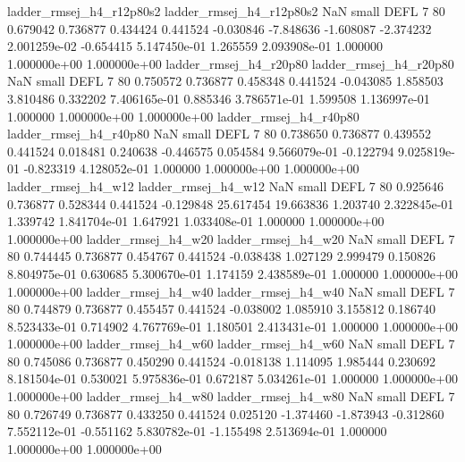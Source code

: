ladder_rmsej_h4_r12p80s2 ladder_rmsej_h4_r12p80s2                   NaN      small     DEFL                 7 80 0.679042       0.736877 0.434424       0.441524   -0.030846     -7.848636     -1.608087    -2.374232   2.001259e-02 -0.654415 5.147450e-01     1.265559   2.093908e-01            1.000000    1.000000e+00        1.000000e+00
  ladder_rmsej_h4_r20p80   ladder_rmsej_h4_r20p80                   NaN      small     DEFL                 7 80 0.750572       0.736877 0.458348       0.441524   -0.043085      1.858503      3.810486     0.332202   7.406165e-01  0.885346 3.786571e-01     1.599508   1.136997e-01            1.000000    1.000000e+00        1.000000e+00
  ladder_rmsej_h4_r40p80   ladder_rmsej_h4_r40p80                   NaN      small     DEFL                 7 80 0.738650       0.736877 0.439552       0.441524    0.018481      0.240638     -0.446575     0.054584   9.566079e-01 -0.122794 9.025819e-01    -0.823319   4.128052e-01            1.000000    1.000000e+00        1.000000e+00
     ladder_rmsej_h4_w12      ladder_rmsej_h4_w12                   NaN      small     DEFL                 7 80 0.925646       0.736877 0.528344       0.441524   -0.129848     25.617454     19.663836     1.203740   2.322845e-01  1.339742 1.841704e-01     1.647921   1.033408e-01            1.000000    1.000000e+00        1.000000e+00
     ladder_rmsej_h4_w20      ladder_rmsej_h4_w20                   NaN      small     DEFL                 7 80 0.744445       0.736877 0.454767       0.441524   -0.038438      1.027129      2.999479     0.150826   8.804975e-01  0.630685 5.300670e-01     1.174159   2.438589e-01            1.000000    1.000000e+00        1.000000e+00
     ladder_rmsej_h4_w40      ladder_rmsej_h4_w40                   NaN      small     DEFL                 7 80 0.744879       0.736877 0.455457       0.441524   -0.038002      1.085910      3.155812     0.186740   8.523433e-01  0.714902 4.767769e-01     1.180501   2.413431e-01            1.000000    1.000000e+00        1.000000e+00
     ladder_rmsej_h4_w60      ladder_rmsej_h4_w60                   NaN      small     DEFL                 7 80 0.745086       0.736877 0.450290       0.441524   -0.018138      1.114095      1.985444     0.230692   8.181504e-01  0.530021 5.975836e-01     0.672187   5.034261e-01            1.000000    1.000000e+00        1.000000e+00
     ladder_rmsej_h4_w80      ladder_rmsej_h4_w80                   NaN      small     DEFL                 7 80 0.726749       0.736877 0.433250       0.441524    0.025120     -1.374460     -1.873943    -0.312860   7.552112e-01 -0.551162 5.830782e-01    -1.155498   2.513694e-01            1.000000    1.000000e+00        1.000000e+00
